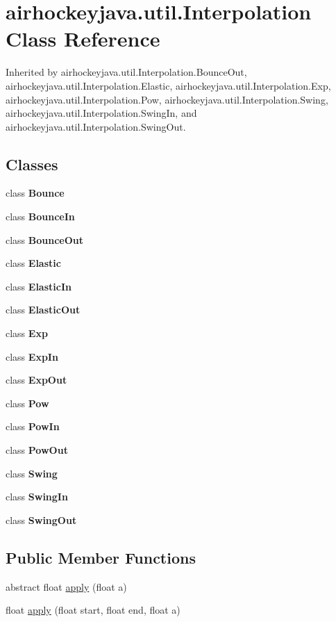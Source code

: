 \hypertarget{classairhockeyjava_1_1util_1_1_interpolation}{}\section{airhockeyjava.\+util.\+Interpolation Class Reference}
\label{classairhockeyjava_1_1util_1_1_interpolation}


Inherited by airhockeyjava.\+util.\+Interpolation.\+Bounce\+Out, airhockeyjava.\+util.\+Interpolation.\+Elastic, airhockeyjava.\+util.\+Interpolation.\+Exp, airhockeyjava.\+util.\+Interpolation.\+Pow, airhockeyjava.\+util.\+Interpolation.\+Swing, airhockeyjava.\+util.\+Interpolation.\+Swing\+In, and airhockeyjava.\+util.\+Interpolation.\+Swing\+Out.

\subsection*{Classes}
\begin{DoxyCompactItemize}
\item 
class {\bfseries Bounce}
\item 
class {\bfseries Bounce\+In}
\item 
class {\bfseries Bounce\+Out}
\item 
class {\bfseries Elastic}
\item 
class {\bfseries Elastic\+In}
\item 
class {\bfseries Elastic\+Out}
\item 
class {\bfseries Exp}
\item 
class {\bfseries Exp\+In}
\item 
class {\bfseries Exp\+Out}
\item 
class {\bfseries Pow}
\item 
class {\bfseries Pow\+In}
\item 
class {\bfseries Pow\+Out}
\item 
class {\bfseries Swing}
\item 
class {\bfseries Swing\+In}
\item 
class {\bfseries Swing\+Out}
\end{DoxyCompactItemize}
\subsection*{Public Member Functions}
\begin{DoxyCompactItemize}
\item 
abstract float \hyperlink{classairhockeyjava_1_1util_1_1_interpolation_a21c50444fd69302dcf68703cb0d261ca}{apply} (float a)
\item 
float \hyperlink{classairhockeyjava_1_1util_1_1_interpolation_ae9900ca245ef1b3a5dde4759dbf648f0}{apply} (float start, float end, float a)
\end{DoxyCompactItemize}
